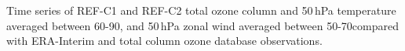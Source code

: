 \label{fig:time_series}
Time series of REF-C1 and REF-C2 total ozone column and 50\,hPa temperature averaged between 60-90\degrees, and 50\,hPa zonal wind averaged between 50-70\degrees compared with ERA-Interim and total column ozone database observations.